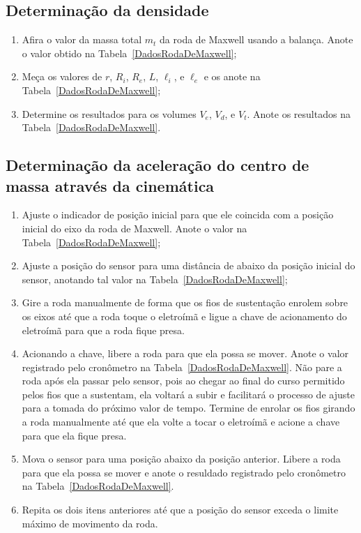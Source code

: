 \subsection{Determinação da densidade}
\begin{enumerate}
	\item Afira o valor da massa total $m_t$ da roda de Maxwell usando a balança. Anote o valor obtido na Tabela~\ref{DadosRodaDeMaxwell};
	\item Meça os valores de $r$, $R_i$, $R_e$, $L$, $\ell_i$, e $\ell_e$ e os anote na Tabela~\ref{DadosRodaDeMaxwell};
	\item Determine os resultados para os volumes $V_e$, $V_d$, e $V_t$. Anote os resultados na Tabela~\ref{DadosRodaDeMaxwell}.
\end{enumerate}

\subsection{Determinação da aceleração do centro de massa através da cinemática}
\begin{enumerate}
	\item Ajuste o indicador de posição inicial para que ele coincida com a posição inicial do eixo da roda de Maxwell. Anote o valor na Tabela~\ref{DadosRodaDeMaxwell};
	\item Ajuste a posição do sensor para uma distância de  abaixo da posição inicial do sensor, anotando tal valor na Tabela~\ref{DadosRodaDeMaxwell};
	\item Gire a roda manualmente de forma que os fios de sustentação enrolem sobre os eixos até que a roda toque o eletroímã e ligue a chave de acionamento do eletroímã para que a roda fique presa.
	\item Acionando a chave, libere a roda para que ela possa se mover. Anote o valor registrado pelo cronômetro na Tabela~\ref{DadosRodaDeMaxwell}. Não pare a roda após ela passar pelo sensor, pois ao chegar ao final do curso permitido pelos fios que a sustentam, ela voltará a subir e facilitará o processo de ajuste para a tomada do próximo valor de tempo. Termine de enrolar os fios girando a roda manualmente até que ela volte a tocar o eletroímã e acione a chave para que ela fique presa.
	\item Mova o sensor para uma posição  abaixo da posição anterior. Libere a roda para que ela possa se mover e anote o resuldado registrado pelo cronômetro na Tabela~\ref{DadosRodaDeMaxwell}.
	\item Repita os dois itens anteriores até que a posição do sensor exceda o limite máximo de movimento da roda.
\end{enumerate}

